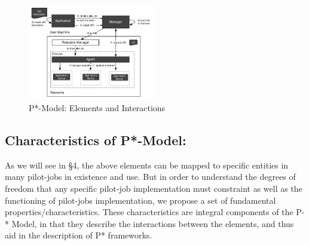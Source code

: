 \documentclass[conference,final]{IEEEtran}
\begin{document}
\begin{figure}[htbp]
    \centering    
    \includegraphics[width=0.5\textwidth]{figures/pstar_model.pdf}
    \caption{P*-Model: Elements and Interactions}
    \label{fig:figures_pstar}
\end{figure}    

% 
% 


\subsection{Characteristics of P*-Model:}
\label{sec:p_star_elements}

As we will see in \S4, the above elements can be mapped to specific
entities in many pilot-jobs in existence and use.  But in order to
understand the degrees of freedom that any specific pilot-job
implementation must constraint as well as the functioning of
pilot-jobs implementation, we propose a set of fundamental
properties/characteristics. These characteristics are integral
components of the P-* Model, in that they describe the interactions
between the elements, and thus aid in the description of P*
frameworks. 

\end{document}
